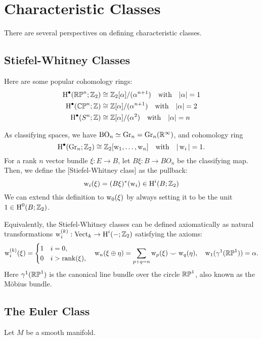 \chapter{Characteristic Classes}

There are several perspectives on defining characteristic classes.

\section{Stiefel-Whitney Classes}

Here are some popular cohomology rings:
\[
	\begin{aligned}
		\operatorname{H}^\bullet(\mathbb{RP}^n; \mathbb{Z}_2)&\cong \mathbb{Z}_2[\alpha]/(\alpha^{n+1})\quad\textrm{with}\quad|\alpha|=1 \\
		\operatorname{H}^\bullet(\mathbb{CP}^n; \mathbb{Z})&\cong \mathbb{Z}[\alpha]/(\alpha^{n+1})\quad\textrm{with}\quad|\alpha|=2 \\
		\operatorname{H}^\bullet(S^n; \mathbb{Z})&\cong \mathbb{Z}[\alpha]/(\alpha^2)\quad\textrm{with}\quad|\alpha|=n \\
	\end{aligned}
\]

As classifying spaces, we have $\operatorname{BO}_n \simeq \operatorname{Gr}_n = \operatorname{Gr}_n(\mathbb{R}^\infty)$, and cohomology ring
\[
  \operatorname{H}^\bullet(\operatorname{Gr}_n; \mathbb{Z}_2) \cong \mathbb{Z}_2[\operatorname{w}_1, \ldots, \operatorname{w}_n]\quad\textrm{with}\quad|\operatorname{w}_i|=1.
\]
For a rank $n$ vector bundle $\xi : E \to B$, let $B\xi : B \to BO_n$ be the classifying map. Then, we define the [Stiefel-Whitney class] as the pullback:
\[
  \operatorname{w}_i(\xi)=(B\xi)^*(\operatorname{w}_i) \in \operatorname{H}^i(B; \mathbb{Z}_2)
\]
We can extend this definition to $\operatorname{w}_0(\xi)$ by always setting it to be the unit $1\in \operatorname{H}^0(B; \mathbb{Z}_2)$.


Equivalently, the Stiefel-Whitney classes can be defined axiomatically as natural transformations $\operatorname{w}_i^{(k)} : \operatorname{Vect}_k \to \operatorname{H}^i(-; \mathbb{Z}_2)$ satisfying the axioms:
\[
  \operatorname{w}_i^{(k)}(\xi)=\begin{cases}1 & i=0,\\ 0 & i > \operatorname{rank}(\xi),\end{cases}\quad \operatorname{w}_n(\xi\oplus \eta) = \sum_{p+q=n}\operatorname{w}_p(\xi)\smile \operatorname{w}_q(\eta), \quad\operatorname{w}_1(\gamma^1(\mathbb{RP}^1)) = \alpha.
\]
Here $\gamma^1(\mathbb{RP}^1)$ is the canonical line bundle over the circle $\mathbb{RP}^1$, also known as the M\"obius bundle.

\section{The Euler Class}

Let $M$ be a smooth manifold.

